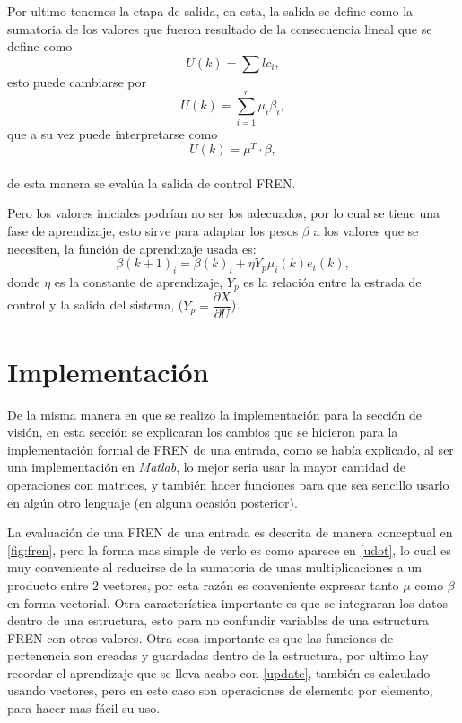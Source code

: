     Por ultimo tenemos la etapa de salida, en esta, la salida se define como la sumatoria de los valores que fueron resultado de la consecuencia lineal que se define como \begin{equation}
    \label{ulc}
    U(k)= \sum lc_{i},
    \end{equation} esto puede cambiarse por \begin{equation}
    \label{usum}
    U(k)=\sum_{i=1}^{r} \mu_i \beta_i,
    \end{equation} que a su vez  puede interpretarse como
    \begin{equation}
    \label{udot}
    U(k)=\mu^T \cdot \beta ,
    \end{equation}\\
    de esta manera se evalúa la salida de control FREN.
    
    Pero los valores iniciales podrían no ser los adecuados, por lo cual se tiene una fase de aprendizaje, esto sirve para adaptar los pesos $\beta$ a los valores que se necesiten, la función de aprendizaje usada es: \begin{equation}
    \label{update}
    \beta(k+1)_i=\beta(k)_i+\eta Y_p \mu_i(k) e_i(k),
    \end{equation} donde $\eta$ es la constante de aprendizaje, $Y_p$ es la relación entre la estrada de control y la salida del sistema, ($Y_p= \dfrac{\partial X}{\partial U}$).
    
    
    \section{Implementación}
    
    
    De la misma manera en que se realizo la implementación para la sección de visión, en esta sección se explicaran los cambios que se hicieron para la implementación formal de FREN de una entrada, como se había explicado, al ser una implementación en \textit{Matlab}, lo mejor seria usar la mayor cantidad de operaciones con matrices, y también hacer funciones para que sea sencillo usarlo en algún otro lenguaje (en alguna ocasión posterior).
    
    La evaluación de una FREN de una entrada es descrita de manera conceptual en \cref{fig:fren}, pero la forma mas simple de verlo es como aparece en \cref{udot}, lo cual es muy conveniente al reducirse de la sumatoria de unas multiplicaciones a un producto entre 2 vectores, por esta razón es conveniente expresar tanto $\mu$ como $\beta$ en forma vectorial. Otra característica importante es que se integraran los datos dentro de una estructura,  esto para no confundir variables de una estructura FREN con otros valores. Otra cosa importante es que las funciones de pertenencia son creadas y guardadas dentro de la estructura, por ultimo hay recordar el aprendizaje que se lleva acabo con \cref{update}, también es calculado usando vectores, pero en este caso son operaciones de elemento por elemento, para hacer mas fácil su uso.
    
